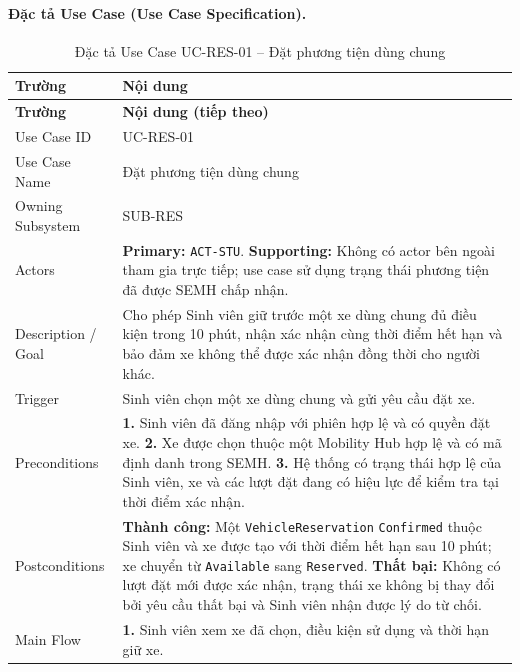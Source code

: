\paragraph{Đặc tả Use Case (Use Case Specification).}
\small
\begin{longtable}{|L{42mm}|L{102mm}|}
  \caption{Đặc tả Use Case UC-RES-01 -- Đặt phương tiện dùng chung}\label{tab:spec-UC-RES-01}\\
  \hline
  \centering\arraybackslash\textbf{Trường} & \centering\arraybackslash\textbf{Nội dung}\\
  \hline
  \endfirsthead
  \hline
  \centering\arraybackslash\textbf{Trường} & \centering\arraybackslash\textbf{Nội dung (tiếp theo)}\\
  \hline
  \endhead
  Use Case ID & UC-RES-01\\\hline
  Use Case Name & Đặt phương tiện dùng chung\\\hline
  Owning Subsystem & SUB-RES\\\hline
  Actors & \textbf{Primary:} \texttt{ACT-STU}. \textbf{Supporting:} Không có actor bên ngoài tham gia trực tiếp; use case sử dụng trạng thái phương tiện đã được SEMH chấp nhận.\\\hline
  Description / Goal & Cho phép Sinh viên giữ trước một xe dùng chung đủ điều kiện trong 10 phút, nhận xác nhận cùng thời điểm hết hạn và bảo đảm xe không thể được xác nhận đồng thời cho người khác.\\\hline
  Trigger & Sinh viên chọn một xe dùng chung và gửi yêu cầu đặt xe.\\\hline
  Preconditions &
    \textbf{1.} Sinh viên đã đăng nhập với phiên hợp lệ và có quyền đặt xe.\newline
    \textbf{2.} Xe được chọn thuộc một Mobility Hub hợp lệ và có mã định danh trong SEMH.\newline
    \textbf{3.} Hệ thống có trạng thái hợp lệ của Sinh viên, xe và các lượt đặt đang có hiệu lực để kiểm tra tại thời điểm xác nhận.\\\hline
  Postconditions &
    \textbf{Thành công:} Một \texttt{VehicleReservation} \texttt{Confirmed} thuộc Sinh viên và xe được tạo với thời điểm hết hạn sau 10 phút; xe chuyển từ \texttt{Available} sang \texttt{Reserved}.\newline
    \textbf{Thất bại:} Không có lượt đặt mới được xác nhận, trạng thái xe không bị thay đổi bởi yêu cầu thất bại và Sinh viên nhận được lý do từ chối.\\\hline
  Main Flow &
    \textbf{1.} Sinh viên xem xe đã chọn, điều kiện sử dụng và thời hạn giữ xe.\newline

\end{longtable}
